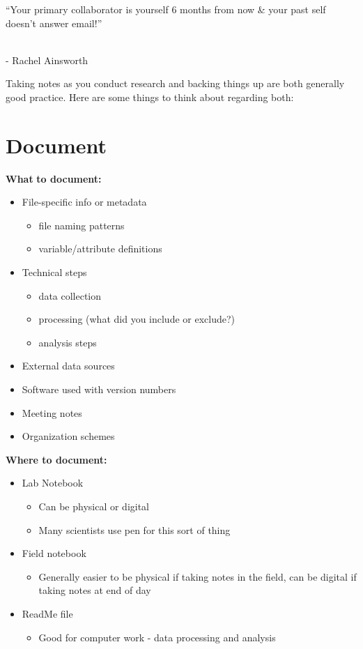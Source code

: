 \documentclass[
  letterpaper,
  DIV=11,
  numbers=noendperiod]{scrreprt}
\providecommand{\tightlist}{%
  \setlength{\itemsep}{0pt}\setlength{\parskip}{0pt}}\usepackage{longtable,booktabs,array}
\begin{document}
``Your primary collaborator is yourself 6 months from now \& your past
self doesn't answer email!''\\
\strut \\
- Rachel Ainsworth

Taking notes as you conduct research and backing things up are both
generally good practice. Here are some things to think about regarding
both:

\section{Document}\label{document}

\textbf{What} \textbf{to document:}

\begin{itemize}
\item
  File-specific info or metadata

  \begin{itemize}
  \item
    file naming patterns
  \item
    variable/attribute definitions
  \end{itemize}
\item
  Technical steps

  \begin{itemize}
  \item
    data collection
  \item
    processing (what did you include or exclude?)
  \item
    analysis steps
  \end{itemize}
\item
  External data sources
\item
  Software used with version numbers
\item
  Meeting notes
\item
  Organization schemes
\end{itemize}

\textbf{Where to document:}

\begin{itemize}
\item
  Lab Notebook

  \begin{itemize}
  \item
    Can be physical or digital
  \item
    Many scientists use pen for this sort of thing
  \end{itemize}
\item
  Field notebook

  \begin{itemize}
  \tightlist
  \item
    Generally easier to be physical if taking notes in the field, can be
    digital if taking notes at end of day
  \end{itemize}
\item
  ReadMe file

  \begin{itemize}
  \tightlist
  \item
    Good for computer work - data processing and analysis
  \end{itemize}
\end{itemize}
\end{document}
